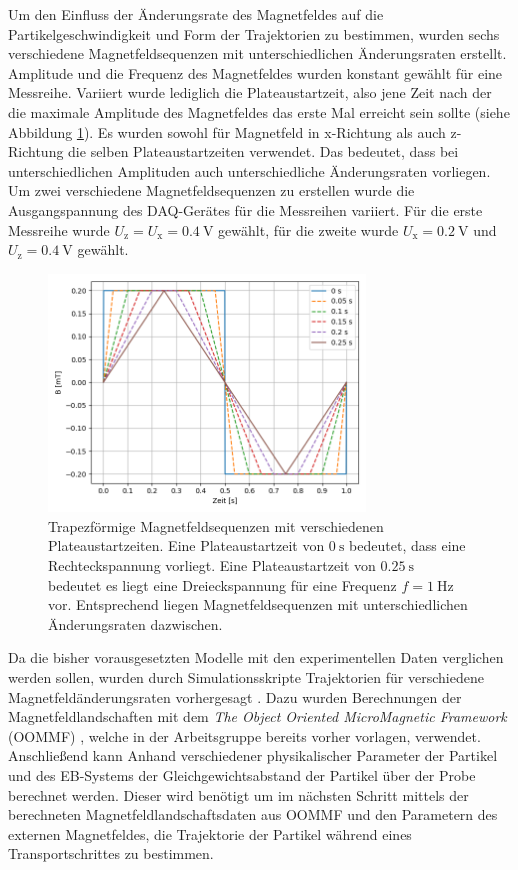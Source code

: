 \documentclass[page,pdftex,12pt,a4paper,twoside,openright]{scrbook}
\begin{document}
Um den Einfluss der Änderungsrate des Magnetfeldes auf die Partikelgeschwindigkeit und Form der Trajektorien zu bestimmen, wurden sechs verschiedene Magnetfeldsequenzen mit unterschiedlichen Änderungsraten erstellt. Amplitude und die Frequenz des Magnetfeldes wurden konstant gewählt für eine Messreihe. Variiert wurde lediglich die Plateaustartzeit, also jene Zeit nach der die maximale Amplitude des Magnetfeldes das erste Mal erreicht sein sollte (siehe Abbildung \ref{fig-plateau}). Es wurden sowohl für Magnetfeld in x-Richtung als auch z-Richtung die selben Plateaustartzeiten verwendet. Das bedeutet, dass bei unterschiedlichen Amplituden auch unterschiedliche Änderungsraten vorliegen. Um zwei verschiedene Magnetfeldsequenzen zu erstellen wurde die Ausgangspannung des DAQ-Gerätes für die Messreihen variiert. Für die erste Messreihe wurde \(U_\mathrm{z} = U_\mathrm{x} = \SI{0.4}{\volt}\) gewählt, für die zweite wurde \(U_\mathrm{x} = \SI{0.2}{\volt}\) und  \(U_\mathrm{z} = \SI{0.4}{\volt}\) gewählt.

\begin{figure}[h]
\centering
\includegraphics[width=0.75\textwidth]{./img/plateau.png}
\caption{\label{fig-plateau}
Trapezförmige Magnetfeldsequenzen mit verschiedenen Plateaustartzeiten. Eine Plateaustartzeit von \(\SI{0}{\s}\) bedeutet, dass eine Rechteckspannung vorliegt. Eine Plateaustartzeit von \(\SI{0.25}{\s}\) bedeutet es liegt eine Dreieckspannung für eine Frequenz \(f = \SI{1}{\hertz}\) vor. Entsprechend liegen Magnetfeldsequenzen mit unterschiedlichen Änderungsraten dazwischen.}
\end{figure}

Da die bisher vorausgesetzten Modelle mit den experimentellen Daten verglichen werden sollen, wurden durch Simulationsskripte Trajektorien für verschiedene Magnetfeldänderungsraten vorhergesagt \cite{holzinger_pythonscript_nodate}. Dazu wurden Berechnungen der Magnetfeldlandschaften mit dem \emph{The Object Oriented MicroMagnetic Framework} (OOMMF) \cite{donahue_oommf_1999}, welche in der Arbeitsgruppe bereits vorher vorlagen, verwendet. Anschließend kann Anhand verschiedener physikalischer Parameter der Partikel und des EB-Systems der Gleichgewichtsabstand der Partikel über der Probe berechnet werden. Dieser wird benötigt um im nächsten Schritt mittels der berechneten Magnetfeldlandschaftsdaten aus OOMMF und den Parametern des externen Magnetfeldes, die Trajektorie der Partikel während eines Transportschrittes zu bestimmen.
\end{document}
